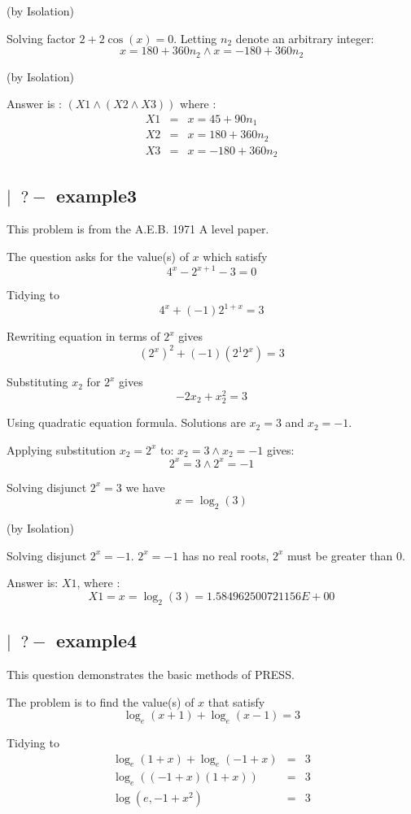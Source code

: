      (by Isolation)


Solving factor $2 + 2\cos(x) = 0$. Letting $n_2$ denote an arbitrary 
integer:
\[x = 180 + 360n_2 \wedge x = -180 + 360n_2\]

   (by Isolation)

\vspace*{0.25in}
Answer is : $(X1 \wedge (X2 \wedge X3))$ where :
\begin{eqnarray*}
    X1 & = &  x = 45 + 90n_1\\
    X2 & = & x = 180 + 360n_2\\
    X3 & = & x = -180 + 360n_2
\end{eqnarray*}
\newpage
\subsection*{$\mid\;\; ?-$ example3}

This problem is from the A.E.B. 1971 A level paper.

The question asks for the value(s) of $x$ which satisfy
\[4^x - 2^{x+1} - 3 = 0\]

Tidying to 
\[4^x + (-1)2^{1 + x} = 3\]

Rewriting equation in terms of $2^x$ gives 
\[(2^x)^2 + (-1)(2^{1}2^x) = 3\]

Substituting $x_2$ for $2^x$ gives
\[-2x_2 + x_2^2 = 3\]

Using quadratic equation formula. Solutions are $x_2 = 3$ and $x_2 = -1$.

Applying substitution $x_2 = 2^x$ to: $x_2 = 3 \wedge x_2 = -1$ gives: 
\[2^x = 3 \wedge 2^x = -1\]

Solving disjunct $2^x = 3$ we have 
\[x = \log_2(3)\]

(by Isolation)

Solving disjunct $2^x = -1$. $2^x = -1$ has no real roots, $2^x$ must be 
greater than 0.

Answer is: $X1$, where :
\[X1 =  x = \log_2(3) = 1.584962500721156E+00\]


\newpage
\subsection*{$\mid\;\; ?-$ example4}

This question demonstrates the basic methods of PRESS.

The problem is to find the value(s) of $x$ that satisfy
\[\log_e(x+1) + \log_e(x-1) = 3\]

Tidying to 
\begin{eqnarray*}
\log_e(1+x) + \log_e(-1+x) & = & 3\\
\log_e((-1 + x)(1 + x)) & = & 3\\
\log(e, -1 + x^2) & = & 3
\end{eqnarray*}

